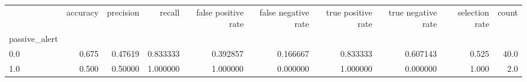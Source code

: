 \begin{tabular}{lrrrrrrrrr}
\toprule
{} &  accuracy &  precision &    recall &  false positive rate &  false negative rate &  true positive rate &  true negative rate &  selection rate &  count \\
passive\_alert &           &            &           &                      &                      &                     &                     &                 &        \\
\midrule
0.0           &     0.675 &    0.47619 &  0.833333 &             0.392857 &             0.166667 &            0.833333 &            0.607143 &           0.525 &   40.0 \\
1.0           &     0.500 &    0.50000 &  1.000000 &             1.000000 &             0.000000 &            1.000000 &            0.000000 &           1.000 &    2.0 \\
\bottomrule
\end{tabular}
